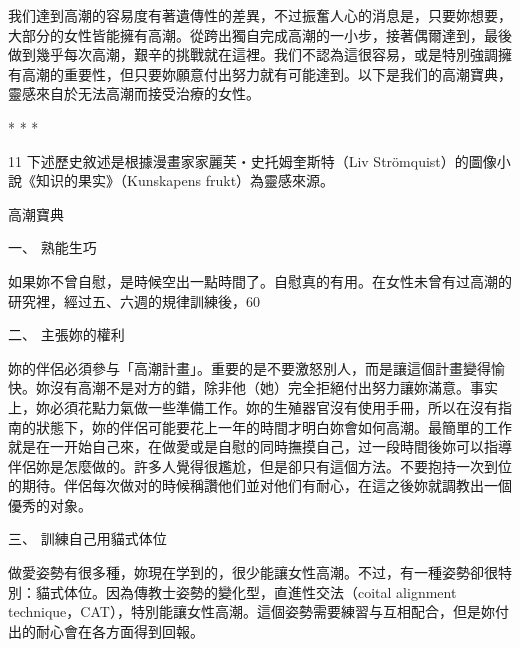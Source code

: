 \documentclass[12pt,UTF8]{ctexbook}
\begin{document}
我们達到高潮的容易度有著遺傳性的差異，不过振奮人心的消息是，只要妳想要，大部分的女性皆能擁有高潮。從跨出獨自完成高潮的一小步，接著偶爾達到，最後做到幾乎每次高潮，艱辛的挑戰就在這裡。我们不認為這很容易，或是特別強調擁有高潮的重要性，但只要妳願意付出努力就有可能達到。以下是我们的高潮寶典，靈感來自於无法高潮而接受治療的女性。





* * *



11	下述歷史敘述是根據漫畫家家麗芙‧史托姆奎斯特（Liv Strömquist）的圖像小說《知识的果实》（Kunskapens frukt）為靈感來源。





高潮寶典




一、 熟能生巧

如果妳不曾自慰，是時候空出一點時間了。自慰真的有用。在女性未曾有过高潮的研究裡，經过五、六週的規律訓練後，60%



二、 主張妳的權利

妳的伴侶必須參与「高潮計畫」。重要的是不要激怒別人，而是讓這個計畫變得愉快。妳沒有高潮不是对方的錯，除非他（她）完全拒絕付出努力讓妳滿意。事实上，妳必須花點力氣做一些準備工作。妳的生殖器官沒有使用手冊，所以在沒有指南的狀態下，妳的伴侶可能要花上一年的時間才明白妳會如何高潮。最簡單的工作就是在一开始自己來，在做愛或是自慰的同時撫摸自己，过一段時間後妳可以指導伴侶妳是怎麼做的。許多人覺得很尷尬，但是卻只有這個方法。不要抱持一次到位的期待。伴侶每次做对的時候稱讚他们並对他们有耐心，在這之後妳就調教出一個優秀的对象。



三、 訓練自己用貓式体位

做愛姿勢有很多種，妳現在学到的，很少能讓女性高潮。不过，有一種姿勢卻很特別：貓式体位。因為傳教士姿勢的變化型，直進性交法（coital alignment technique，CAT），特別能讓女性高潮。這個姿勢需要練習与互相配合，但是妳付出的耐心會在各方面得到回報。
\end{document}
